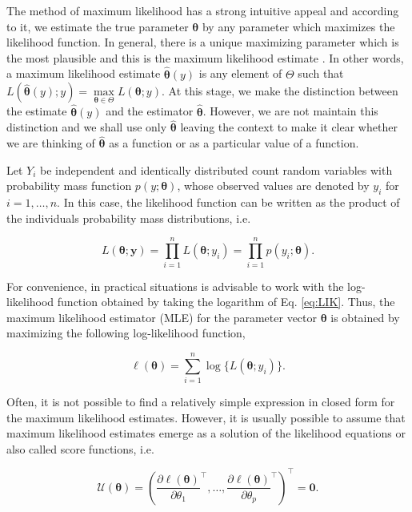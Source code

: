 \documentclass[9pt,a5paper,]{book}
\theoremstyle{definition}
\theoremstyle{definition}
\theoremstyle{remark}
\begin{document}
The method of maximum likelihood has a strong intuitive appeal and
according to it, we estimate the true parameter \(\boldsymbol{\theta}\)
by any parameter which maximizes the likelihood function. In general,
there is a unique maximizing parameter which is the most plausible and
this is the maximum likelihood estimate \citep{Silvey:1975}. In other
words, a maximum likelihood estimate \(\hat{\boldsymbol{\theta}}(y)\) is
any element of \(\Theta\) such that
\(L(\hat{\boldsymbol{\theta}}(y);y) = \underset{\boldsymbol{\theta}\in \Theta}\max L(\boldsymbol{\theta};y).\)
At this stage, we make the distinction between the estimate
\(\hat{\boldsymbol{\theta}}(y)\) and the estimator
\(\hat{\boldsymbol{\theta}}\). However, we are not maintain this
distinction and we shall use only \(\hat{\boldsymbol{\theta}}\) leaving
the context to make it clear whether we are thinking of
\(\hat{\boldsymbol{\theta}}\) as a function or as a particular value of
a function.

Let \(Y_i\) be independent and identically distributed count random
variables with probability mass function \(p(y;\boldsymbol{\theta})\),
whose observed values are denoted by \(y_i\) for \(i = 1, \ldots, n.\)
In this case, the likelihood function can be written as the product of
the individuals probability mass distributions, i.e.

\begin{equation}
L(\boldsymbol{\theta};\boldsymbol{y}) = \prod_{i=1}^n L(\boldsymbol{\theta}; y_i) = \prod_{i=1}^n p(y_i; \boldsymbol{\theta}).
\label{eq:LIK}
\end{equation}

For convenience, in practical situations is advisable to work with the
log-likelihood function obtained by taking the logarithm of Eq.
\eqref{eq:LIK}. Thus, the maximum likelihood estimator (MLE) for the
parameter vector \(\boldsymbol{\theta}\) is obtained by maximizing the
following log-likelihood function,

\begin{equation}
\ell(\boldsymbol{\theta})=\sum^n_{i=1} \log\{ L(\boldsymbol{\theta}; y_i) \}.
\label{eq:LOGLIK}
\end{equation}

Often, it is not possible to find a relatively simple expression in
closed form for the maximum likelihood estimates. However, it is usually
possible to assume that maximum likelihood estimates emerge as a
solution of the likelihood equations or also called score functions,
i.e.

\begin{equation}
\mathcal{U}(\boldsymbol{\theta}) = \left ( \frac{\partial \ell(\boldsymbol{\theta})}{\partial \theta_1}^\top, \ldots, \frac{\partial \ell(\boldsymbol{\theta})}{\partial \theta_p}^\top \right )^\top = \boldsymbol{0}.
\label{eq:SCORE}
\end{equation}
\end{document}
